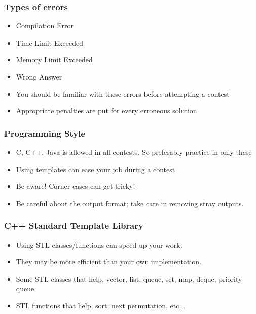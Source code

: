 \documentclass{beamer}
\begin{document}

\begin{frame}
\frametitle{Types of errors}
\begin{itemize}
\item Compilation Error
\item Time Limit Exceeded
\item Memory Limit Exceeded
\item Wrong Answer
\item You should be familiar with these errors before attempting a contest
\item Appropriate penalties are put for every erroneous solution
\end{itemize}
\end{frame}



\begin{frame}
\frametitle{Programming Style}
\begin{itemize}
\item C, C++, Java is allowed in all contests. So preferably practice
in only these
\item Using templates can ease your job during a contest
\item Be aware! Corner cases can get tricky!
\item Be careful about the output format; take care in removing
stray outputs.
\end{itemize}
\end{frame}



\begin{frame}
\frametitle{C++ Standard Template Library}
\begin{itemize}
\item Using STL classes/functions can speed up your work.
\item They may be more efficient than your own implementation.
\item Some STL classes that help, \newline
vector, list, queue, set, map, deque, priority queue
\item STL functions that help, \newline
sort, next permutation, etc...
\end{itemize}
\end{frame}
\end{document}
